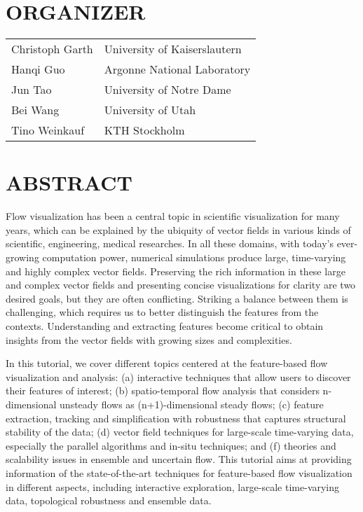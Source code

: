 \documentclass[preprint,journal]{vgtc}       %
\begin{document}
\section*{ORGANIZER}

\vspace{-0.1in}
\begin{table}[H]
\begin{tabular}{ll}
Christoph Garth & University of Kaiserslautern\\
Hanqi Guo & Argonne National Laboratory\\
Jun Tao & University of Notre Dame\\
Bei Wang & University of Utah\\
Tino Weinkauf & KTH Stockholm
\end{tabular}
\end{table}

\section*{ABSTRACT}
Flow visualization has been a central topic in scientific visualization for many years, which can be explained by the ubiquity of vector fields in various kinds of scientific, engineering, medical researches. In all these domains, with today's ever-growing computation power, numerical simulations produce large, time-varying and highly complex vector fields. Preserving the rich information in these large and complex vector fields and presenting concise visualizations for clarity are two desired goals, but they are often conflicting. Striking a balance between them is challenging, which requires us to better distinguish the features from the contexts. Understanding and extracting features become critical to obtain insights from the vector fields with growing sizes and complexities.

In this tutorial, we cover different topics centered at the feature-based flow visualization and analysis: (a) interactive techniques that allow users to discover their features of interest; (b) spatio-temporal flow analysis that considers n-dimensional unsteady flows as (n+1)-dimensional steady flows; (c) feature extraction, tracking and simplification with robustness that captures structural stability of the data; (d) vector field techniques for large-scale time-varying data, especially the parallel algorithms and in-situ techniques; and (f) theories and scalability issues in ensemble and uncertain flow. This tutorial aims at providing information of the state-of-the-art techniques for feature-based flow visualization in different aspects, including interactive exploration, large-scale time-varying data, topological robustness and ensemble data.
\end{document}
